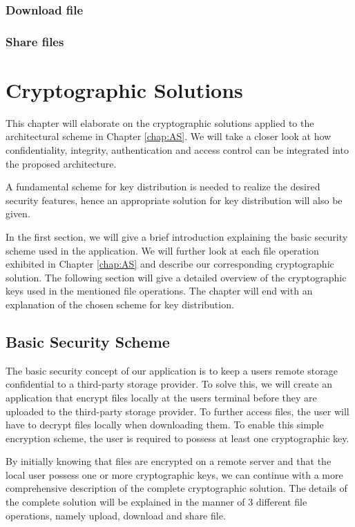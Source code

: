 \documentclass[english,12pt,a4paper]{book}
\begin{document}
\subsection{Download file}

\subsection{Share files}


\chapter{Cryptographic Solutions}
\label{chap:CS}
This chapter will elaborate on the cryptographic solutions applied to the
architectural scheme in Chapter \ref{chap:AS}. We will take a closer look at
how confidentiality, integrity, authentication and access control can be 
integrated into the proposed architecture.

A fundamental scheme for key distribution is needed to realize the desired
security features, hence an appropriate solution for key distribution will
also be given.

In the first section, we will give a brief introduction explaining the basic security
scheme used in the application. We will further look at each file operation 
exhibited in Chapter \ref{chap:AS} and describe our corresponding cryptographic
solution. The following section will give a detailed overview of the
cryptographic keys used in the mentioned file operations. The chapter will end with an 
explanation of the chosen scheme for key distribution.

\section{Basic Security Scheme}
The basic security concept of our application is to keep a users remote storage
confidential to a third-party storage provider. To solve this, we will
create an application that encrypt files locally at the users terminal before
they are uploaded to the third-party storage provider. To further access files, the user will have
to decrypt files locally when downloading them. To enable this simple
encryption scheme, the user is required to possess at least one cryptographic key.

By initially knowing that files are encrypted on a remote server and that the local user
possess one or more cryptographic keys, we can continue with a more comprehensive
description of the complete cryptographic solution. The details of the complete
solution will be explained in the manner of 3 different file operations, namely
upload, download and share file.
\end{document}
